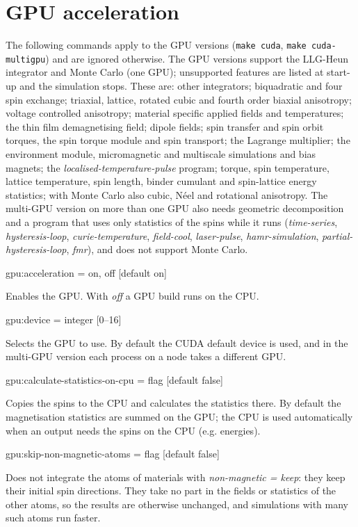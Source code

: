 \section*{GPU acceleration}
The following commands apply to the GPU versions (\texttt{make cuda}, \texttt{make cuda-multigpu}) and are ignored otherwise. The GPU versions support the LLG-Heun integrator and Monte Carlo (one GPU); unsupported features are listed at start-up and the simulation stops. These are: other integrators; biquadratic and four spin exchange; triaxial, lattice, rotated cubic and fourth order biaxial anisotropy; voltage controlled anisotropy; material specific applied fields and temperatures; the thin film demagnetising field; dipole fields; spin transfer and spin orbit torques, the spin torque module and spin transport; the Lagrange multiplier; the environment module, micromagnetic and multiscale simulations and bias magnets; the \textit{localised-temperature-pulse} program; torque, spin temperature, lattice temperature, spin length, binder cumulant and spin-lattice energy statistics; with Monte Carlo also cubic, N\'eel and rotational anisotropy. The multi-GPU version on more than one GPU also needs geometric decomposition and a program that uses only statistics of the spins while it runs (\textit{time-series}, \textit{hysteresis-loop}, \textit{curie-temperature}, \textit{field-cool}, \textit{laser-pulse}, \textit{hamr-simulation}, \textit{partial-hysteresis-loop}, \textit{fmr}), and does not support Monte Carlo.

{\zicf gpu:acceleration = on, off [default on]} Enables the GPU. With \textit{off} a GPU build runs on the CPU.

{\zicf gpu:device = integer [0--16]} Selects the GPU to use. By default the CUDA default device is used, and in the multi-GPU version each process on a node takes a different GPU.

{\zicf gpu:calculate-statistics-on-cpu = flag [default false]} Copies the spins to the CPU and calculates the statistics there. By default the magnetisation statistics are summed on the GPU; the CPU is used automatically when an output needs the spins on the CPU (e.g. energies).

{\zicf gpu:skip-non-magnetic-atoms = flag [default false]} Does not integrate the atoms of materials with \textit{non-magnetic = keep}: they keep their initial spin directions. They take no part in the fields or statistics of the other atoms, so the results are otherwise unchanged, and simulations with many such atoms run faster.

